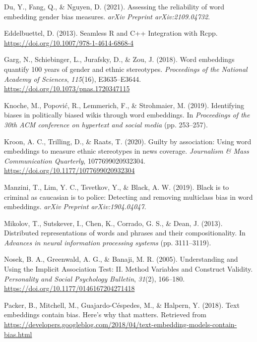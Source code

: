 \documentclass[english,man]{apa6}
\begin{document}
\leavevmode\hypertarget{ref-du2021assessing}{}%
Du, Y., Fang, Q., \& Nguyen, D. (2021). Assessing the reliability of word embedding gender bias measures. \emph{arXiv Preprint arXiv:2109.04732}.

\leavevmode\hypertarget{ref-eddelbuettel:2013:SRC}{}%
Eddelbuettel, D. (2013). Seamless R and C++ Integration with Rcpp. \url{https://doi.org/10.1007/978-1-4614-6868-4}

\leavevmode\hypertarget{ref-garg:2018:W}{}%
Garg, N., Schiebinger, L., Jurafsky, D., \& Zou, J. (2018). Word embeddings quantify 100 years of gender and ethnic stereotypes. \emph{Proceedings of the National Academy of Sciences}, \emph{115}(16), E3635--E3644. \url{https://doi.org/10.1073/pnas.1720347115}

\leavevmode\hypertarget{ref-knoche2019identifying}{}%
Knoche, M., Popović, R., Lemmerich, F., \& Strohmaier, M. (2019). Identifying biases in politically biased wikis through word embeddings. In \emph{Proceedings of the 30th ACM conference on hypertext and social media} (pp. 253--257).

\leavevmode\hypertarget{ref-kroon2020guilty}{}%
Kroon, A. C., Trilling, D., \& Raats, T. (2020). Guilty by association: Using word embeddings to measure ethnic stereotypes in news coverage. \emph{Journalism \& Mass Communication Quarterly}, 1077699020932304. \url{https://doi.org/10.1177/1077699020932304}

\leavevmode\hypertarget{ref-manzini2019black}{}%
Manzini, T., Lim, Y. C., Tsvetkov, Y., \& Black, A. W. (2019). Black is to criminal as caucasian is to police: Detecting and removing multiclass bias in word embeddings. \emph{arXiv Preprint arXiv:1904.04047}.

\leavevmode\hypertarget{ref-mikolov2013distributed}{}%
Mikolov, T., Sutskever, I., Chen, K., Corrado, G. S., \& Dean, J. (2013). Distributed representations of words and phrases and their compositionality. In \emph{Advances in neural information processing systems} (pp. 3111--3119).

\leavevmode\hypertarget{ref-nosek:2005:UUI}{}%
Nosek, B. A., Greenwald, A. G., \& Banaji, M. R. (2005). Understanding and Using the Implicit Association Test: II. Method Variables and Construct Validity. \emph{Personality and Social Psychology Bulletin}, \emph{31}(2), 166--180. \url{https://doi.org/10.1177/0146167204271418}

\leavevmode\hypertarget{ref-packer2018text}{}%
Packer, B., Mitchell, M., Guajardo-Céspedes, M., \& Halpern, Y. (2018). Text embeddings contain bias. Here's why that matters. Retrieved from \url{https://developers.googleblog.com/2018/04/text-embedding-models-contain-bias.html}
\end{document}
